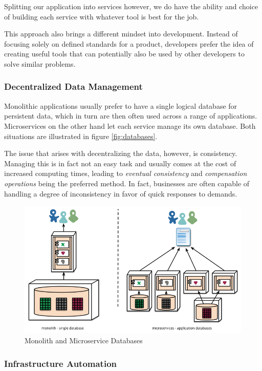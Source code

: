 Splitting our application into services however, we do have the
ability and choice of building each service with whatever tool is best
for the job.

This approach also brings a different mindset into development.
Instead of focusing solely on defined standards for a product,
developers prefer the idea of creating useful tools that can
potentially also be used by other developers to solve similar
problems.

\subsubsection{Decentralized Data Management } 

Monolithic applications usually prefer to have a single logical
database for persistent data, which in turn are then often used across
a range of applications. Microservices on the other hand let each
service manage its own database. Both situations are illustrated in 
figure \vref{fig:databases}.

The issue that arises with decentralizing the data, however, is
consistency.  Managing this is in fact not an easy task and usually
comes at the cost of increased computing times, leading to
\textit{eventual consistency} and \textit{compensation operations}
being the preferred method.  In fact, businesses are often capable of
handling a degree of inconsistency in favor of quick responses to
demands.

\begin{figure}
	\centering
	\includegraphics[width=\linewidth]{images/decentralised-data.png}
	\caption{Monolith and Microservice Databases}
	\label{fig:databases}
\end{figure}

\subsubsection{Infrastructure Automation}

